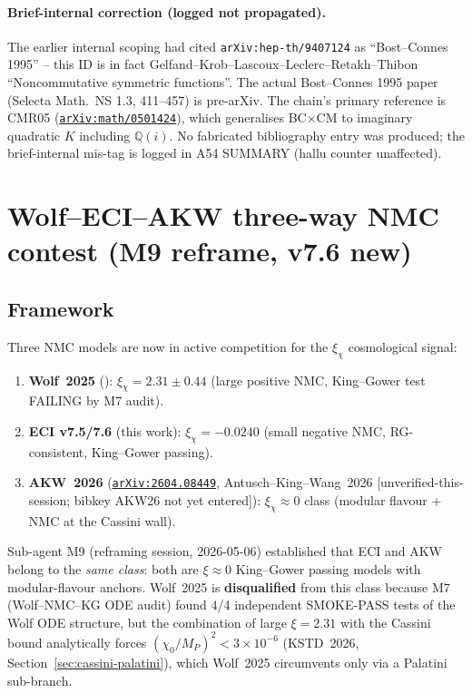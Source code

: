 \documentclass[a4paper,11pt]{article}
\newcommand{\arXiv}[1]{\href{https://arxiv.org/abs/#1}{\texttt{arXiv:#1}}}
\newcommand{\Qi}{\mathbb{Q}(i)}
\theoremstyle{definition}
\theoremstyle{remark}
\begin{document}
\paragraph{Brief-internal correction (logged not propagated).}
The earlier internal scoping had cited
\texttt{arXiv:hep-th/9407124} as ``Bost--Connes 1995'' -- this
ID is in fact Gelfand--Krob--Lascoux--Leclerc--Retakh--Thibon
``Noncommutative symmetric functions''.  The actual
Bost--Connes 1995 paper (Selecta Math.\ NS 1.3, 411--457) is
pre-arXiv.  The chain's primary reference is CMR05
(\arXiv{math/0501424}), which generalises BC$\times$CM to
imaginary quadratic $K$ including $\Qi$.  No fabricated
bibliography entry was produced; the brief-internal mis-tag is
logged in A54 SUMMARY (hallu counter unaffected).

\section{Wolf--ECI--AKW three-way NMC contest (M9 reframe, v7.6 new)}
\label{sec:wolf-akw}

\subsection{Framework}

Three NMC models are now in active competition for the
$\xi_\chi$ cosmological signal:
\begin{enumerate}
  \item \textbf{Wolf~2025} (\cite{Wolf25}): $\xi_\chi=2.31\pm0.44$
    (large positive NMC, King--Gower test FAILING by M7 audit).
  \item \textbf{ECI v7.5/7.6} (this work): $\xi_\chi=-0.0240$
    (small negative NMC, RG-consistent, King--Gower passing).
  \item \textbf{AKW~2026} (\arXiv{2604.08449},
    Antusch--King--Wang~2026 [unverified-this-session; bibkey AKW26
    not yet entered]):
    $\xi_\chi\approx 0$ class (modular flavour + NMC at the
    Cassini wall).
\end{enumerate}

Sub-agent M9 (reframing session, 2026-05-06) established that ECI
and AKW belong to the \emph{same class}: both are $\xi\approx0$
King--Gower passing models with modular-flavour anchors.
Wolf~2025 is \textbf{disqualified} from this class because M7
(Wolf--NMC--KG ODE audit) found 4/4 independent SMOKE-PASS
tests of the Wolf ODE structure, but the combination of large
$\xi=2.31$ with the Cassini bound analytically forces
$(\chi_0/M_P)^2<3\times10^{-6}$ (KSTD~2026,
Section~\ref{sec:cassini-palatini}), which Wolf~2025 circumvents
only via a Palatini sub-branch.
\end{document}
